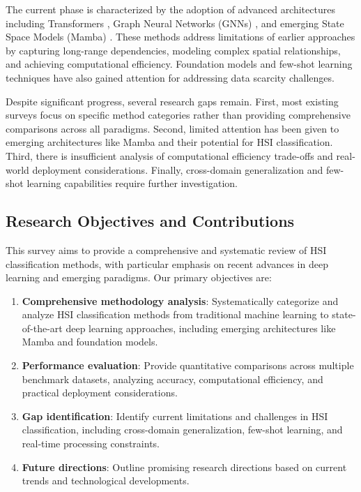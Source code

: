 \documentclass[journal]{IEEEtran}
\begin{document}
The current phase is characterized by the adoption of advanced architectures including Transformers \cite{hong2021spectralformer}, Graph Neural Networks (GNNs) \cite{qin2020spectral}, and emerging State Space Models (Mamba) \cite{zhu2024mambahsi}. These methods address limitations of earlier approaches by capturing long-range dependencies, modeling complex spatial relationships, and achieving computational efficiency. Foundation models \cite{wang2024spectral_earth} and few-shot learning techniques \cite{zhang2024scformer} have also gained attention for addressing data scarcity challenges.

Despite significant progress, several research gaps remain. First, most existing surveys focus on specific method categories rather than providing comprehensive comparisons across all paradigms. Second, limited attention has been given to emerging architectures like Mamba and their potential for HSI classification. Third, there is insufficient analysis of computational efficiency trade-offs and real-world deployment considerations. Finally, cross-domain generalization and few-shot learning capabilities require further investigation.

\subsection{Research Objectives and Contributions}

This survey aims to provide a comprehensive and systematic review of HSI classification methods, with particular emphasis on recent advances in deep learning and emerging paradigms. Our primary objectives are:

\begin{enumerate}
\item \textbf{Comprehensive methodology analysis}: Systematically categorize and analyze HSI classification methods from traditional machine learning to state-of-the-art deep learning approaches, including emerging architectures like Mamba and foundation models.

\item \textbf{Performance evaluation}: Provide quantitative comparisons across multiple benchmark datasets, analyzing accuracy, computational efficiency, and practical deployment considerations.

\item \textbf{Gap identification}: Identify current limitations and challenges in HSI classification, including cross-domain generalization, few-shot learning, and real-time processing constraints.

\item \textbf{Future directions}: Outline promising research directions based on current trends and technological developments.
\end{enumerate}
\end{document}
